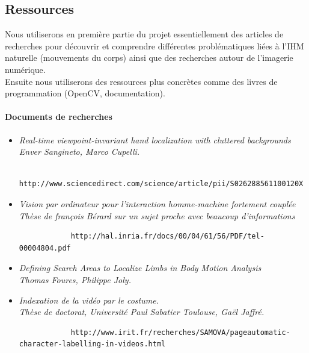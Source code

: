 \documentclass{article}
\begin{document}
		\subsection{Ressources}
		Nous utiliserons en première partie du projet essentiellement des articles de recherches pour découvrir et comprendre différentes problématiques liées à l'IHM naturelle (mouvements du corps) ainsi que des recherches autour de l'imagerie numérique. \\ Ensuite nous utiliserons des ressources plus concrètes comme des livres de programmation (OpenCV, documentation).
		
		\paragraph{Documents de recherches}
			\begin{itemize}
			\item \it{Real-time viewpoint-invariant hand localization with cluttered backgrounds} \\
			Enver Sangineto, Marco Cupelli.
			\begin{verbatim}
			http://www.sciencedirect.com/science/article/pii/S026288561100120X
			\end{verbatim}
			\item \it{Vision par ordinateur pour l’interaction homme-machine fortement couplée}\\
			Thèse de françois Bérard sur un sujet proche avec beaucoup d'informations
			\begin{verbatim}
			http://hal.inria.fr/docs/00/04/61/56/PDF/tel-00004804.pdf
			\end{verbatim}
			\item \it{Defining Search Areas to Localize Limbs in Body Motion Analysis} \\
			Thomas Foures, Philippe Joly.
			\item \it{Indexation de la vidéo par le costume.}\\ 
			Thèse de doctorat, Université Paul Sabatier Toulouse, Gaël Jaffré.
			\begin{verbatim}
			http://www.irit.fr/recherches/SAMOVA/pageautomatic-character-labelling-in-videos.html
			\end{verbatim}
			\end{itemize}
			
\end{document}
